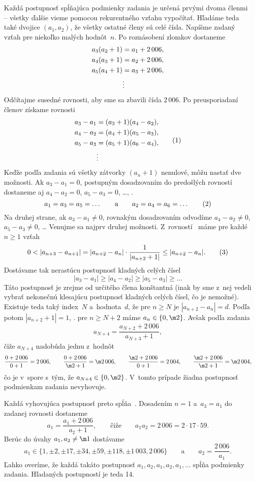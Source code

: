 {%
Každá postupnosť spĺňajúca podmienky zadania je určená prvými dvoma členmi -- všetky ďalšie vieme pomocou rekurentného vzťahu vypočítať. Hľadáme teda také dvojice $(a_1,a_2)$, že všetky ostatné členy sú celé čísla. Napíšme zadaný vzťah pre niekoľko malých hodnôt~$n$. Po roznásobení zlomkov dostaneme
$$
\aligned
  a_3(a_2+1)&=a_1+2\,006,\\
  a_4(a_3+1)&=a_2+2\,006,\\
  a_5(a_4+1)&=a_3+2\,006,\\
  &\vdots
\endaligned
$$
Odčítajme susedné rovnosti, aby sme sa zbavili čísla $2\,006$. Po preusporiadaní členov získame rovnosti
$$
\aligned
  a_3-a_1&=(a_3+1)(a_4-a_2),\\
  a_4-a_2&=(a_4+1)(a_5-a_3),\\
  a_5-a_3&=(a_5+1)(a_6-a_4),\\
  &\vdots
\endaligned
\tag1
$$
Keďže podľa zadania sú všetky zátvorky $(a_n+1)$ nenulové, môžu nastať dve možnosti. Ak $a_3-a_1=0$, postupným dosadzovaním do predošlých rovností dostaneme aj $a_4-a_2=0$, $a_5-a_3=0$, \dots, \tj.
$$
  a_1=a_3=a_5=\dots\qquad\text{a}\qquad a_2=a_4=a_6=\dots
\tag2
$$
Na druhej strane, ak $a_3-a_1\ne0$, rovnakým dosadzovaním odvodíme $a_4-a_2\ne0$, $a_5-a_3\ne0$, \dots{}
Venujme sa najprv druhej možnosti. Z~rovností~ máme pre každé $n\ge1$ vzťah
$$
  0<|a_{n+3}-a_{n+1}|=|a_{n+2}-a_{n}|\cdot\frac{1}{|a_{n+2}+1|}\le|a_{n+2}-a_{n}|.
\tag3
$$
Dostávame tak nerastúcu postupnosť kladných celých čísel
$$
  |a_3-a_1|\ge|a_4-a_2|\ge|a_5-a_3|\ge\dots
$$
Táto postupnosť je zrejme od určitého člena konštantná (inak by sme z~nej vedeli vybrať nekonečnú klesajúcu postupnosť kladných celých čísel, čo je nemožné). Existuje teda taký index~$N$ a~hodnota~$d$, že pre $n\ge N$ je $|a_{n+2}-a_n|=d$. Podľa  potom $|a_{n+2}+1|=1$, \tj. pre $n\ge N+2$ máme $a_n\in\{0,\m2\}$. Avšak podľa zadania
$$
  a_{N+4}=\frac{a_{N+2}+2\,006}{a_{N+3}+1},
$$
čiže $a_{N+4}$ nadobúda jednu z~hodnôt
$$
  \frac{0+2\,006}{0+1}=2\,006,\qquad
  \frac{0+2\,006}{\m2+1}=\m2\,006,\qquad
  \frac{\m2+2\,006}{0+1}=2\,004,\qquad
  \frac{\m2+2\,006}{\m2+1}=\m2\,004,
$$
čo je v~spore s~tým, že $a_{N+4}\in\{0,\m2\}$. V~tomto prípade žiadna postupnosť podmienkam zadania nevyhovuje.

Každá vyhovujúca postupnosť preto spĺňa~. Dosadením $n=1$ a~$a_3=a_1$ do zadanej rovnosti dostaneme
$$
  a_{1}=\frac{a_1+2\,006}{a_2+1},\qquad\text{čiže}\qquad a_1a_2=2\,006=2\cdot17\cdot59.
$$
Berúc do úvahy $a_1,a_2\ne\m1$ dostávame
$$
  a_1\in\{1,\pm2,\pm17,\pm34,\pm59,\pm118,\pm1\,003,2\,006\}\qquad\text{a}\qquad a_2=\frac{2\,006}{a_1}.
$$
Ľahko overíme, že každá takáto postupnosť $a_1,a_2,a_1,a_2,a_1,\dots$ spĺňa podmienky zadania. Hľadaných postupností je teda 14.}

